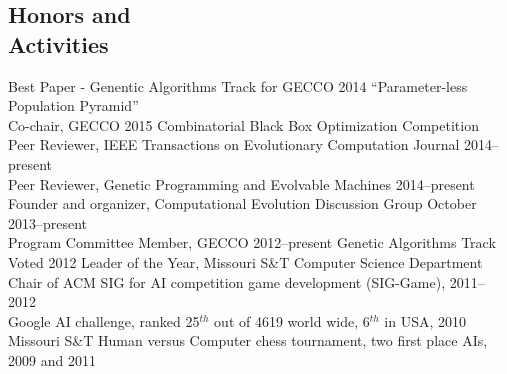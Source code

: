 \documentclass[margin,line]{resume}
\begin{document}
\begin{resume}
    \section{\mysidestyle Honors and\\Activities}
    Best Paper - Genentic Algorithms Track for GECCO 2014 ``Parameter-less Population Pyramid''\\%
    Co-chair, GECCO 2015 Combinatorial Black Box Optimization Competition\\%
    Peer Reviewer, IEEE Transactions on Evolutionary Computation Journal 2014--present\\%
    Peer Reviewer, Genetic Programming and Evolvable Machines 2014--present\\%
    Founder and organizer, Computational Evolution Discussion Group October 2013--present\\%
    Program Committee Member, GECCO 2012--present Genetic Algorithms Track \vspace{1mm}\\%
    Voted 2012 Leader of the Year, Missouri S\&T Computer Science Department \vspace{1mm}\\%
    Chair of ACM SIG for AI competition game development (SIG-Game), 2011--2012 \vspace{1mm}\\%
    Google AI challenge, ranked 25$^{th}$ out of 4619 world wide, 6$^{th}$ in USA, 2010 \vspace{1mm}\\%
    Missouri S\&T Human versus Computer chess tournament, two first place AIs, 2009 and 2011 \vspace{1mm}\\%
\begin{comment}    
    ACM SIG-Game Competition testing and balancing using evolving AI, 2009--2012 \vspace{1mm}\\%
    ACM SIG-Game first place AI, 2008          \vspace{1mm}\\%
    University of Illinois at Urbana-Champaign MechMania AI competition second place AI, 2007  \vspace{1mm}\\%
    Missouri S\&T Alumni Scholarship 2006--2010             %


\end{comment}
\end{resume}
\end{document}
